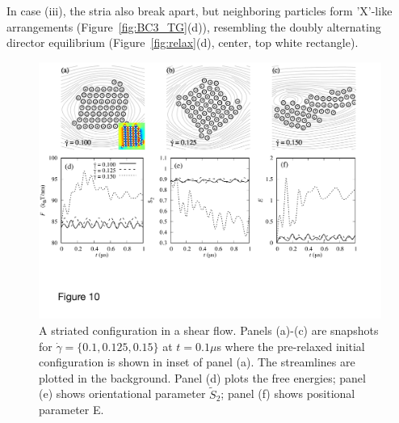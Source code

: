 \documentclass[prb,preprint,showpacs,preprintnumbers,amsmath,amssymb,longbibliography]{revtex4-1}
\begin{document}
In case (iii), the stria also break apart, but neighboring particles form
'X'-like arrangements (Figure~\ref{fig:BC3_TG}(d)), resembling the doubly alternating
director equilibrium (Figure~\ref{fig:relax}(d), center, top white rectangle).



\begin{figure}
  \begin{center}
\includegraphics[width=1.0\textwidth]{Figures/Figure10.pdf}        
  \end{center}
      \caption{\label{fig:BC3_shear}  A striated configuration in a shear flow. Panels (a)-(c) are snapshots for $\dot \gamma = \{0.1, 0.125, 0.15\}$ at $t=0.1\mu$s where the pre-relaxed initial configuration is shown in inset of panel (a). The streamlines are plotted in the background.
Panel (d) plots the free energies; panel (e) shows orientational parameter $\tilde{S}_2$; panel (f) shows positional parameter E.
    }
\end{figure}
\end{document}

